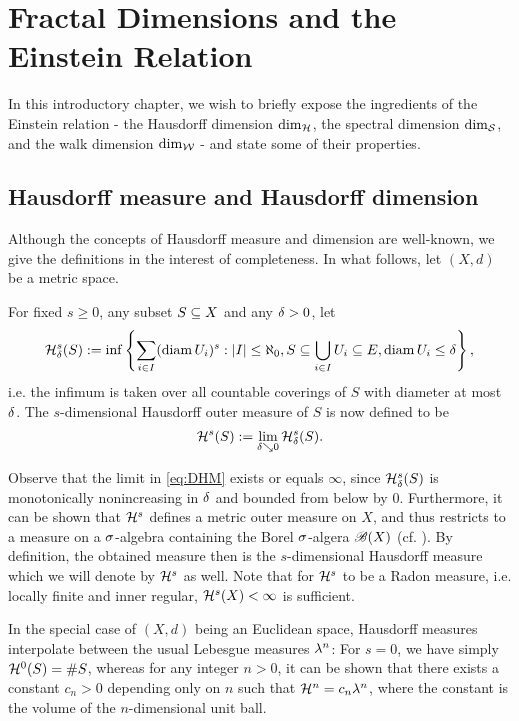 \chapter{Fractal Dimensions and the Einstein Relation}

In this introductory chapter, we wish to briefly expose the ingredients of the Einstein relation - the Hausdorff dimension $\dim_{\mathcal{H}}$, the spectral dimension $\dim_{\mathcal{S}}$, and the walk dimension $\dim_{\mathcal{W}}$ - and state some of their properties. 

\section{Hausdorff measure and Hausdorff dimension}

Although the concepts of Hausdorff measure and dimension are well-known, we give the definitions in the interest of completeness. In what follows, let $(X,d)$ be a metric space.
\begin{defin}
  For fixed $s\geq0$, any subset $S\subseteq X$ and any $\delta>0$, let 
  \[
    \mathcal{H}^s_\delta(S)
      :=\inf \left\{\sum_{i\in I}(\operatorname{diam} U_i)^s:
            |I|\leq\aleph_0,S\subseteq\bigcup_{i\in I}U_i\subseteq E,\operatorname{diam} U_i\leq\delta\right\},
  \]
  i.e. the infimum is taken over all countable coverings of $S$ with diameter at most $\delta$. The $s$-dimensional Hausdorff outer measure of $S$ is now defined to be
  \begin{equation}\label{eq:DHM}
    \mathcal{H}^s(S):=\lim_{\delta\searrow0}\mathcal{H}^s_\delta(S).
  \end{equation}
\end{defin}
Observe that the limit in \eqref{eq:DHM} exists or equals $\infty$, since $\mathcal{H}^s_\delta(S)$ is monotonically nonincreasing in $\delta$ and bounded from below by 0. Furthermore, it can be shown that $\mathcal{H}^s$ defines a metric outer measure on $X$, and thus restricts to a measure on a $\sigma$-algebra containing the Borel $\sigma$-algera $\mathscr{B}(X)$ (cf. \cite[p.54ff]{mattila1999geometry}). By definition, the obtained measure then is the $s$-dimensional Hausdorff measure which we will denote by $\mathcal{H}^s$ as well. Note that for $\mathcal{H}^s$ to be a Radon measure, i.e. locally finite and inner regular, $\mathcal{H}^s(X)<\infty$ is sufficient.

In the special case of $(X,d)$ being an Euclidean space, Hausdorff measures interpolate between the usual Lebesgue measures $\lambda^n$: For $s=0$, we have simply $\mathcal{H}^0(S)=\# S$, whereas for any integer $n>0$, it can be shown that there exists a constant $c_n>0$ depending only on $n$ such that $\mathcal{H}^n=c_n\lambda^n$, where the constant is the volume of the $n$-dimensional unit ball.


